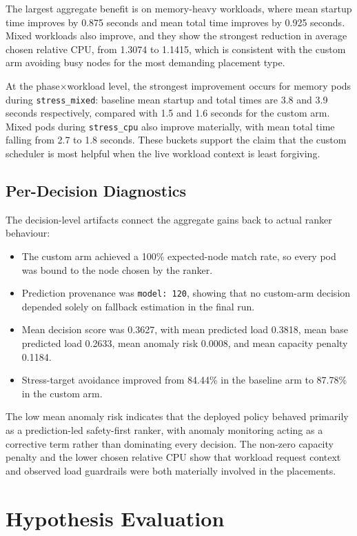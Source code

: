 The largest aggregate benefit is on memory-heavy workloads, where mean startup time improves by 0.875 seconds and mean total time improves by 0.925 seconds. Mixed workloads also improve, and they show the strongest reduction in average chosen relative CPU, from 1.3074 to 1.1415, which is consistent with the custom arm avoiding busy nodes for the most demanding placement type.

At the phase\(\times\)workload level, the strongest improvement occurs for memory pods during \texttt{stress\_mixed}: baseline mean startup and total times are 3.8 and 3.9 seconds respectively, compared with 1.5 and 1.6 seconds for the custom arm. Mixed pods during \texttt{stress\_cpu} also improve materially, with mean total time falling from 2.7 to 1.8 seconds. These buckets support the claim that the custom scheduler is most helpful when the live workload context is least forgiving.


\subsection{Per-Decision Diagnostics}

The decision-level artifacts connect the aggregate gains back to actual ranker behaviour:

\begin{itemize}
\item The custom arm achieved a 100\% expected-node match rate, so every pod was bound to the node chosen by the ranker.
\item Prediction provenance was \texttt{model: 120}, showing that no custom-arm decision depended solely on fallback estimation in the final run.
\item Mean decision score was 0.3627, with mean predicted load 0.3818, mean base predicted load 0.2633, mean anomaly risk 0.0008, and mean capacity penalty 0.1184.
\item Stress-target avoidance improved from 84.44\% in the baseline arm to 87.78\% in the custom arm.
\end{itemize}

The low mean anomaly risk indicates that the deployed policy behaved primarily as a prediction-led safety-first ranker, with anomaly monitoring acting as a corrective term rather than dominating every decision. The non-zero capacity penalty and the lower chosen relative CPU show that workload request context and observed load guardrails were both materially involved in the placements.


\section{Hypothesis Evaluation}
\label{sec:hypothesis-eval}


